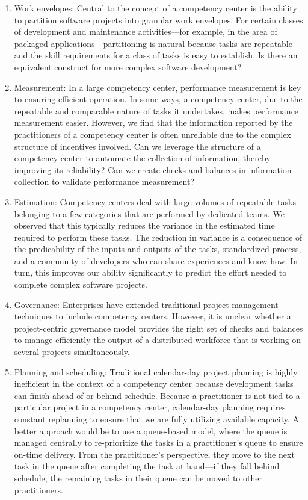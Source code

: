 \begin{enumerate}

\item Work envelopes: Central to the concept of a competency center is the
  ability to partition software projects into granular work envelopes. For
  certain classes of development and maintenance activities---for example, in
  the area of packaged applications---partitioning is natural because tasks are
  repeatable and the skill requirements for a class of tasks is easy to
  establish. Is there an equivalent construct for more complex software
  development?

\item Measurement: In a large competency center, performance measurement is key
  to ensuring efficient operation. In some ways, a competency center, due to the
  repeatable and comparable nature of tasks it undertakes, makes performance
  measurement easier. However, we find that the information reported by the
  practitioners of a competency center is often unreliable due to the complex
  structure of incentives involved. Can we leverage the structure of a
  competency center to automate the collection of information, thereby improving
  its reliability? Can we create checks and balances in information collection
  to validate performance measurement?

\item Estimation: Competency centers deal with large volumes of repeatable tasks
  belonging to a few categories that are performed by dedicated teams. We
  observed that this typically reduces the variance in the estimated time
  required to perform these tasks. The reduction in variance is a consequence of
  the predicability of the inputs and outputs of the tasks, standardized
  process, and a community of developers who can share experiences and
  know-how. In turn, this improves our ability significantly to predict the
  effort needed to complete complex software projects.

\item Governance: Enterprises have extended traditional project management
  techniques to include competency centers. However, it is unclear whether a
  project-centric governance model provides the right set of checks and balances
  to manage efficiently the output of a distributed workforce that is working on
  several projects simultaneously.

\item Planning and scheduling: Traditional calendar-day project planning is
  highly inefficient in the context of a competency center because development
  tasks can finish ahead of or behind schedule. Because a practitioner is not
  tied to a particular project in a competency center, calendar-day planning
  requires constant replanning to ensure that we are fully utilizing available
  capacity. A better approach would be to use a queue-based model, where the
  queue is managed centrally to re-prioritize the tasks in a practitioner's
  queue to ensure on-time delivery. From the practitioner's perspective, they
  move to the next task in the queue after completing the task at hand---if
  they fall behind schedule, the remaining tasks in their queue can be moved to
  other practitioners.


\end{enumerate}
